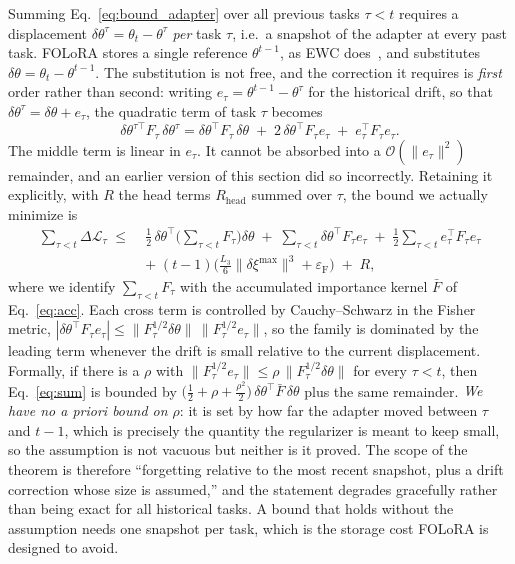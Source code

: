 \begin{remark}
\label{rem:oneref}
Summing Eq.~\eqref{eq:bound_adapter} over all previous tasks $\tau<t$ requires a
displacement $\delta\theta^{\tau}=\theta_t-\theta^{\tau}$ \emph{per} task $\tau$, i.e.\ a
snapshot of the adapter at every past task. FOLoRA stores a single reference
$\theta^{t-1}$, as EWC does~\cite{kirkpatrick2017overcoming}, and substitutes
$\delta\theta=\theta_t-\theta^{t-1}$. The substitution is not free, and the correction it
requires is \emph{first} order rather than second: writing $e_\tau=\theta^{t-1}-\theta^{\tau}$
for the historical drift, so that $\delta\theta^{\tau}=\delta\theta+e_\tau$, the quadratic
term of task $\tau$ becomes
\begin{equation}
\delta\theta^{\tau\top}F_\tau\,\delta\theta^{\tau}
=
\delta\theta^{\!\top}F_\tau\,\delta\theta
\;+\;2\,\delta\theta^{\!\top}F_\tau e_\tau
\;+\;e_\tau^{\!\top}F_\tau e_\tau .
\label{eq:cross}
\end{equation}
The middle term is linear in $e_\tau$. It cannot be absorbed into a
$\mathcal{O}(\|e_\tau\|^{2})$ remainder, and an earlier version of this section did so
incorrectly. Retaining it explicitly, with $R$ the head terms $R_{\text{head}}$ summed over
$\tau$, the bound we actually minimize is
\begin{equation}
\begin{split}
\sum_{\tau<t}\Delta\mathcal{L}_\tau
\;\le\;
{}& \frac12\,\delta\theta^{\!\top}\Big(\sum_{\tau<t}F_\tau\Big)\delta\theta
\;+\;\sum_{\tau<t}\delta\theta^{\!\top}F_\tau e_\tau
\;+\;\frac12\sum_{\tau<t}e_\tau^{\!\top}F_\tau e_\tau \\
&+\;(t-1)\Big(\frac{L_3}{6}\|\delta\xi^{\max}\|^{3}+\varepsilon_{\mathrm{F}}\Big)
\;+\;R ,
\end{split}
\label{eq:sum}
\end{equation}
where we identify $\sum_{\tau<t}F_\tau$ with the accumulated importance kernel $\bar{F}$
of Eq.~\eqref{eq:acc}. Each cross term is controlled by Cauchy--Schwarz in the Fisher
metric,
$|\delta\theta^{\!\top}F_\tau e_\tau|\le\|F_\tau^{1/2}\delta\theta\|\,\|F_\tau^{1/2}e_\tau\|$,
so the family is dominated by the leading term whenever the drift is small relative to the
current displacement. Formally, if there is a $\rho$ with
$\|F_\tau^{1/2}e_\tau\|\le\rho\,\|F_\tau^{1/2}\delta\theta\|$ for every $\tau<t$, then
Eq.~\eqref{eq:sum} is bounded by
$\big(\tfrac12+\rho+\tfrac{\rho^{2}}{2}\big)\,\delta\theta^{\!\top}\bar{F}\,\delta\theta$
plus the same remainder. \emph{We have no a priori bound on $\rho$}: it is set by how far
the adapter moved between $\tau$ and $t-1$, which is precisely the quantity the regularizer
is meant to keep small, so the assumption is not vacuous but neither is it proved. The scope
of the theorem is therefore ``forgetting relative to the most recent snapshot, plus a drift
correction whose size is assumed,'' and the statement degrades gracefully rather than being
exact for all historical tasks. A bound that holds without the assumption needs one
snapshot per task, which is the storage cost FOLoRA is designed to avoid.
\end{remark}
